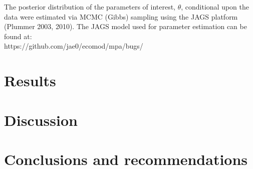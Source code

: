 \documentclass[letterpaper,portrait,11pt]{scrartcl}
\numberwithin{equation}{section}		%
\numberwithin{figure}{section}		%
\numberwithin{table}{section}				%
\begin{document}
The posterior distribution of the parameters of interest, $\theta$, conditional upon the data were estimated via MCMC (Gibbs) sampling using the JAGS platform (Plummer 2003, 2010). The JAGS model used for parameter estimation can be found at: \\

https://github.com/jae0/ecomod/mpa/bugs/




\section{Results}

\section{Discussion}

\section{Conclusions and recommendations}




\clearpage

%
%



\clearpage \newpage
\end{document}
